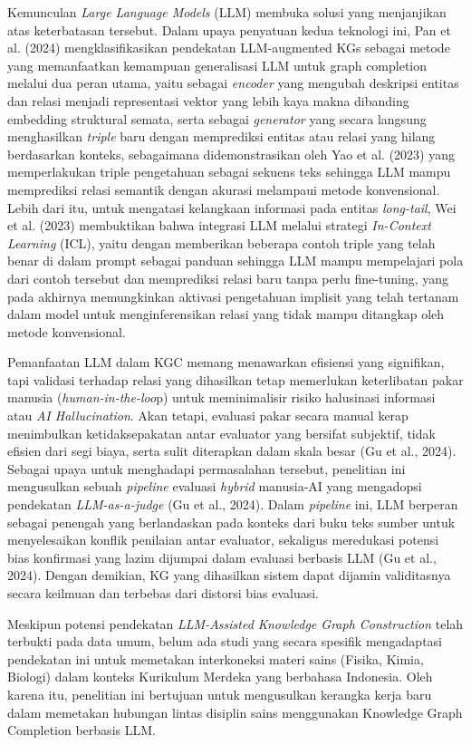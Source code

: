 \documentclass[
]{article}
\begin{document}
Kemunculan \emph{Large Language Models} (LLM) membuka solusi yang
menjanjikan atas keterbatasan tersebut. Dalam upaya penyatuan kedua
teknologi ini, Pan et al. (2024) mengklasifikasikan pendekatan
LLM-augmented KGs sebagai metode yang memanfaatkan kemampuan
generalisasi LLM untuk graph completion melalui dua peran utama, yaitu
sebagai \emph{encoder} yang mengubah deskripsi entitas dan relasi
menjadi representasi vektor yang lebih kaya makna dibanding embedding
struktural semata, serta sebagai \emph{generator} yang secara langsung
menghasilkan \emph{triple} baru dengan memprediksi entitas atau relasi
yang hilang berdasarkan konteks, sebagaimana didemonstrasikan oleh Yao
et al. (2023) yang memperlakukan triple pengetahuan sebagai sekuens teks
sehingga LLM mampu memprediksi relasi semantik dengan akurasi melampaui
metode konvensional. Lebih dari itu, untuk mengatasi kelangkaan
informasi pada entitas \emph{long-tail}, Wei et al. (2023) membuktikan
bahwa integrasi LLM melalui strategi \emph{In-Context Learning} (ICL),
yaitu dengan memberikan beberapa contoh triple yang telah benar di dalam
prompt sebagai panduan sehingga LLM mampu mempelajari pola dari contoh
tersebut dan memprediksi relasi baru tanpa perlu fine-tuning, yang pada
akhirnya memungkinkan aktivasi pengetahuan implisit yang telah tertanam
dalam model untuk menginferensikan relasi yang tidak mampu ditangkap
oleh metode konvensional.

Pemanfaatan LLM dalam KGC memang menawarkan efisiensi yang signifikan,
tapi validasi terhadap relasi yang dihasilkan tetap memerlukan
keterlibatan pakar manusia (\emph{human-in-the-loo}p) untuk
meminimalisir risiko halusinasi informasi atau \emph{AI Hallucination}.
Akan tetapi, evaluasi pakar secara manual kerap menimbulkan
ketidaksepakatan antar evaluator yang bersifat subjektif, tidak efisien
dari segi biaya, serta sulit diterapkan dalam skala besar (Gu et al.,
2024). Sebagai upaya untuk menghadapi permasalahan tersebut, penelitian
ini mengusulkan sebuah \emph{pipeline} evaluasi \emph{hybrid} manusia-AI
yang mengadopsi pendekatan \emph{LLM-as-a-judge} (Gu et al., 2024).
Dalam \emph{pipeline} ini, LLM berperan sebagai penengah yang
berlandaskan pada konteks dari buku teks sumber untuk menyelesaikan
konflik penilaian antar evaluator, sekaligus meredukasi potensi bias
konfirmasi yang lazim dijumpai dalam evaluasi berbasis LLM (Gu et al.,
2024). Dengan demikian, KG yang dihasilkan sistem dapat dijamin
validitasnya secara keilmuan dan terbebas dari distorsi bias evaluasi.

Meskipun potensi pendekatan \emph{LLM-Assisted Knowledge Graph
Construction} telah terbukti pada data umum, belum ada studi yang secara
spesifik mengadaptasi pendekatan ini untuk memetakan interkoneksi materi
sains (Fisika, Kimia, Biologi) dalam konteks Kurikulum Merdeka yang
berbahasa Indonesia. Oleh karena itu, penelitian ini bertujuan untuk
mengusulkan kerangka kerja baru dalam memetakan hubungan lintas disiplin
sains menggunakan Knowledge Graph Completion berbasis LLM.
\end{document}
